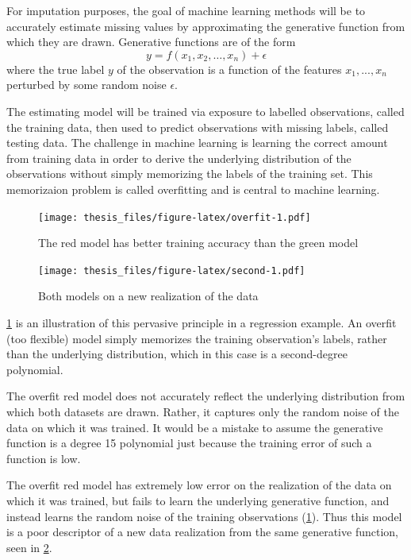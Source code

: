 \documentclass[12pt,twoside]{reedthesis}
\begin{document}
For imputation purposes, the goal of machine learning methods will be to
accurately estimate missing values by approximating the generative
function from which they are drawn. Generative functions are of the form
\[
y = f(x_1, x_2, \dots, x_n) + \epsilon
\] where the true label \(y\) of the observation is a function of the
features \(x_1, ..., x_n\) perturbed by some random noise \(\epsilon\).

The estimating model will be trained via exposure to labelled
observations, called the training data, then used to predict
observations with missing labels, called testing data. The challenge in
machine learning is learning the correct amount from training data in
order to derive the underlying distribution of the observations without
simply memorizing the labels of the training set. This memorizaion
problem is called overfitting and is central to machine learning.
\begin{figure}
\centering
\texttt{[image: thesis\_files/figure-latex/overfit-1.pdf]}
\caption{\label{fig:overfit}The red model has better training accuracy than
the green model}
\end{figure}
\begin{figure}
\centering
\texttt{[image: thesis\_files/figure-latex/second-1.pdf]}
\caption{\label{fig:second}Both models on a new realization of the data}
\end{figure}
\ref{fig:overfit} is an illustration of this pervasive principle in a
regression example. An overfit (too flexible) model simply memorizes the
training observation's labels, rather than the underlying distribution,
which in this case is a second-degree polynomial.

The overfit red model does not accurately reflect the underlying
distribution from which both datasets are drawn. Rather, it captures
only the random noise of the data on which it was trained. It would be a
mistake to assume the generative function is a degree 15 polynomial just
because the training error of such a function is low.

The overfit red model has extremely low error on the realization of the
data on which it was trained, but fails to learn the underlying
generative function, and instead learns the random noise of the training
observations (\ref{fig:overfit}). Thus this model is a poor descriptor
of a new data realization from the same generative function, seen in
\ref{fig:second}.
\end{document}
